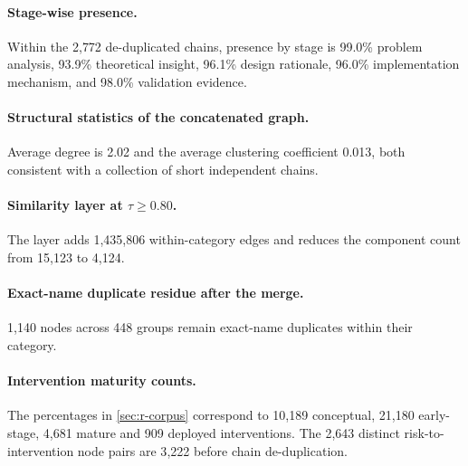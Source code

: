 \documentclass[10pt,twocolumn,letterpaper]{article}
\begin{document}
\paragraph{Stage-wise presence.} Within the 2{,}772 de-duplicated chains, presence by
stage is 99.0\% problem analysis, 93.9\% theoretical insight, 96.1\% design rationale,
96.0\% implementation mechanism, and 98.0\% validation evidence.

\paragraph{Structural statistics of the concatenated graph.} Average degree is 2.02 and
the average clustering coefficient 0.013, both consistent with a collection of short
independent chains.

\paragraph{Similarity layer at $\tau \geq 0.80$.} The layer adds 1{,}435{,}806
within-category edges and reduces the component count from 15{,}123 to 4{,}124.

\paragraph{Exact-name duplicate residue after the merge.} 1{,}140 nodes across 448 groups
remain exact-name duplicates within their category.

\paragraph{Intervention maturity counts.} The percentages in \cref{sec:r-corpus}
correspond to 10{,}189 conceptual, 21{,}180 early-stage, 4{,}681 mature and 909 deployed
interventions. The 2{,}643 distinct risk-to-intervention node pairs are 3{,}222 before
chain de-duplication.
\end{document}
